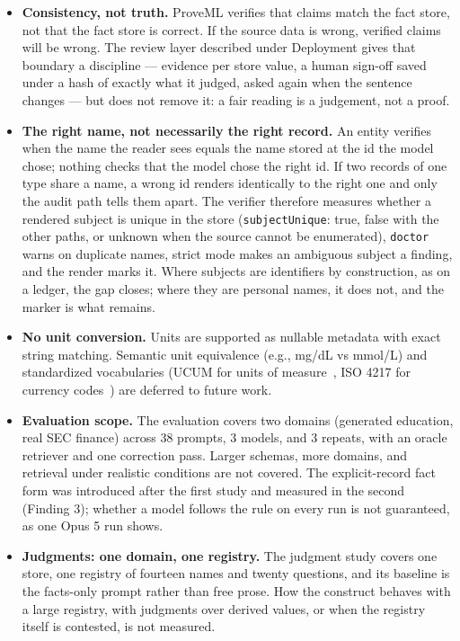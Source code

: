 \documentclass[11pt,a4paper]{article}
\begin{document}
\begin{itemize}[nosep]
    \item \textbf{Consistency, not truth.} ProveML verifies that claims match the fact store, not that the fact store is correct. If the source data is wrong, verified claims will be wrong. The review layer described under Deployment gives that boundary a discipline --- evidence per store value, a human sign-off saved under a hash of exactly what it judged, asked again when the sentence changes --- but does not remove it: a fair reading is a judgement, not a proof.
    \item \textbf{The right name, not necessarily the right record.} An entity verifies when the name the reader sees equals the name stored at the id the model chose; nothing checks that the model chose the right id. If two records of one type share a name, a wrong id renders identically to the right one and only the audit path tells them apart. The verifier therefore measures whether a rendered subject is unique in the store (\texttt{subjectUnique}: true, false with the other paths, or unknown when the source cannot be enumerated), \texttt{doctor} warns on duplicate names, strict mode makes an ambiguous subject a finding, and the render marks it. Where subjects are identifiers by construction, as on a ledger, the gap closes; where they are personal names, it does not, and the marker is what remains.
    \item \textbf{No unit conversion.} Units are supported as nullable metadata with exact string matching. Semantic unit equivalence (e.g., mg/dL vs mmol/L) and standardized vocabularies (UCUM for units of measure~\citep{ucum}, ISO 4217 for currency codes~\citep{iso4217}) are deferred to future work.
    \item \textbf{Evaluation scope.} The evaluation covers two domains (generated education, real SEC finance) across 38 prompts, 3 models, and 3 repeats, with an oracle retriever and one correction pass. Larger schemas, more domains, and retrieval under realistic conditions are not covered. The explicit-record fact form was introduced after the first study and measured in the second (Finding 3); whether a model follows the rule on every run is not guaranteed, as one Opus 5 run shows.
    \item \textbf{Judgments: one domain, one registry.} The judgment study covers one store, one registry of fourteen names and twenty questions, and its baseline is the facts-only prompt rather than free prose. How the construct behaves with a large registry, with judgments over derived values, or when the registry itself is contested, is not measured.

\end{itemize}
\end{document}
